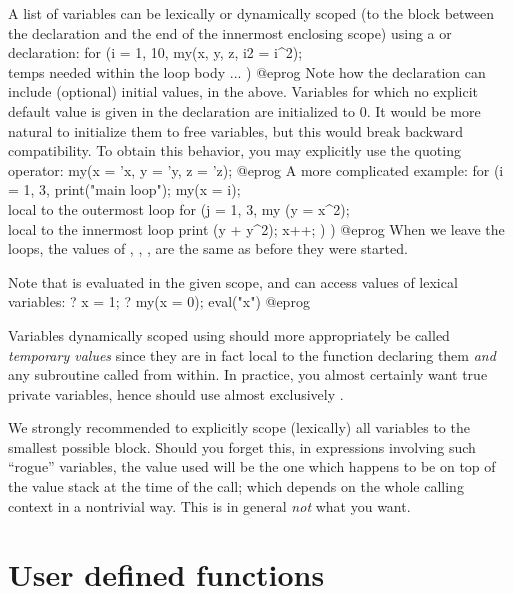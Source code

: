 A list of variables can be lexically or dynamically scoped (to the block
between the declaration and the end of the innermost enclosing scope) using a
 or  declaration:
\bprog
for (i = 1, 10,
  my(x, y, z, i2 = i^2); \\ temps needed within the loop body
  ...
)
@eprog\noindent
Note how the declaration can include (optional) initial values,  in the above. Variables for which no explicit default value is given
in the declaration are initialized to $0$. It would be more natural to
initialize them to free variables, but this would break backward
compatibility. To obtain this behavior, you may explicitly use the quoting
operator:
\bprog
my(x = 'x, y = 'y, z = 'z);
@eprog\noindent
A more complicated example:
\bprog
for (i = 1, 3,
  print("main loop");
  my(x = i);          \\ local to the outermost loop
  for (j = 1, 3,
    my (y = x^2);     \\ local to the innermost loop
    print (y + y^2);
    x++;
  )
)
@eprog\noindent
When we leave the loops, the values of , , , 
are the same as before they were started.

Note that  is evaluated in the given scope, and can access values
of lexical variables:
\bprog
? x = 1;
? my(x = 0); eval("x")
@eprog

Variables dynamically scoped using  should more appropriately be
called \emph{temporary values} since they are in fact local to the function
declaring them \emph{and} any subroutine called from within. In practice, you
almost certainly want true private variables, hence should use almost
exclusively .

We strongly recommended to explicitly scope (lexically) all variables to the
smallest possible block. Should you forget this, in expressions involving such
``rogue'' variables, the value used will be the one which happens to be on
top of the value stack at the time of the call; which depends on the whole
calling context in a nontrivial way. This is in general \emph{not} what you
want.

\section{User defined functions}
\label{se:user_defined}

